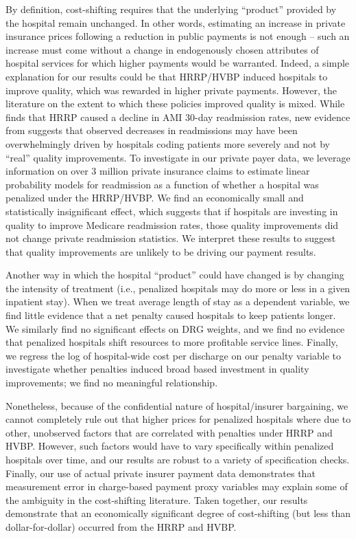 \documentclass[12pt]{article}
\begin{document}
By definition, cost-shifting requires that the underlying ``product'' provided by the hospital remain unchanged. In other words, estimating an increase in private insurance prices following a reduction in public payments is not enough -- such an increase must come without a change in endogenously chosen attributes of hospital services for which higher payments would be warranted.  Indeed, a simple explanation for our results could be that HRRP/HVBP induced hospitals to improve quality, which was rewarded in higher private payments.  However, the literature on the extent to which these policies improved quality is mixed. While \citet{mellor2016} finds that HRRP caused a decline in AMI 30-day readmission rates, new evidence from \citet{Ibrahim2017} suggests that observed decreases in readmissions may have been overwhelmingly driven by hospitals coding patients more severely and not by ``real'' quality improvements.  To investigate in our private payer data, we leverage information on over 3 million private insurance claims to estimate linear probability models for readmission as a function of whether a hospital was penalized under the HRRP/HVBP.  We find an economically small and statistically insignificant effect, which suggests that if hospitals are investing in quality to improve Medicare readmission rates, those quality improvements did not change private readmission statistics.  We interpret these results to suggest that quality improvements are unlikely to be driving our payment results.

Another way in which the hospital ``product'' could have changed is by changing the intensity of treatment (i.e., penalized hospitals may do more or less in a given inpatient stay). When we treat average length of stay as a dependent variable, we find little evidence that a net penalty caused hospitals to keep patients longer. We similarly find no significant effects on DRG weights, and we find no evidence that penalized hospitals shift resources to more profitable service lines.  Finally, we regress the log of hospital-wide cost per discharge on our penalty variable to investigate whether penalties induced broad based investment in quality improvements; we find no meaningful relationship.

Nonetheless, because of the confidential nature of hospital/insurer bargaining, we cannot completely rule out that higher prices for penalized hospitals where due to other, unobserved factors that are correlated with penalties under HRRP and HVBP. However, such factors would have to vary specifically within penalized hospitals over time, and our results are robust to a variety of specification checks.  Finally, our use of actual private insurer payment data demonstrates that measurement error in charge-based payment proxy variables may explain some of the ambiguity in the cost-shifting literature. Taken together, our results demonstrate that an economically significant degree of cost-shifting (but less than dollar-for-dollar) occurred from the HRRP and HVBP.
\end{document}
